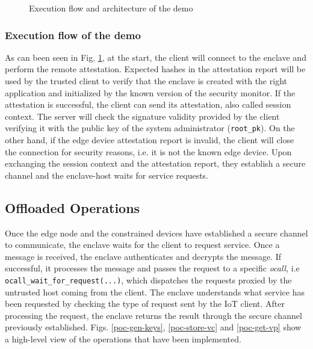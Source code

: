 \begin{figure}[!h]
    \centering
    
    \caption{Execution flow and architecture of the demo}
    \label{poc-architecture}
\end{figure}

\subsubsection{Execution flow of the demo}
As can been seen in Fig. \ref{poc-architecture}, at the start, the client will connect to the enclave and perform the remote attestation. Expected hashes in the attestation report will be used by the trusted client to verify that the enclave is created with the right application and initialized by the known version of the security monitor. If the attestation is successful, the client can send its attestation, also called session context. The server will check the signature validity provided by the client verifying it with the public key of the system administrator (\texttt{root\_pk}). On the other hand, if the edge device attestation report is invalid, the client will close the connection for security reasons, i.e. it is not the known edge device.
Upon exchanging the session context and the attestation report, they establish a secure channel and the enclave-host waits for service requests.

\subsection{Offloaded Operations}
Once the edge node and the constrained devices have established a secure channel to communicate, the enclave waits for the client to request service. Once a message is received, the enclave authenticates and decrypts the message. 
If successful, it processes the message and passes the request to a specific \textit{ocall}, i.e \texttt{ocall\_wait\_for\_request(...)}, which dispatches the requests proxied by the untrusted host coming from the client. 
The enclave understands what service has been requested by checking the type of request sent by the IoT client.
After processing the request, the enclave returns the result through the secure channel previously established. Figs. \ref{poc-gen-keys}, \ref{poc-store-vc} and \ref{poc-get-vp} show a high-level view of the operations that have been implemented. 

